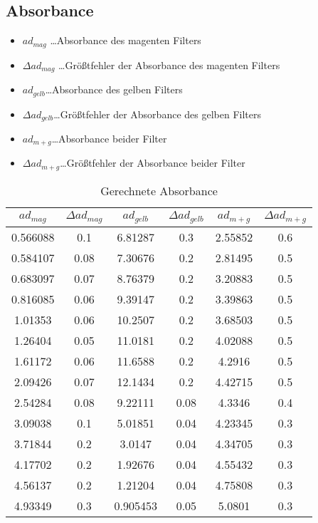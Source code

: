 \documentclass[a4paper]{article}
\begin{document}
\subsection{Absorbance}
\begin{table}[ht]
  \centering
  \caption{Gerechnete Absorbance}
  \begin{itemize}
    \item $ad_{mag}$ \dots Absorbance des magenten Filters
    \item $\Delta ad_{mag}$ \dots Größtfehler der Absorbance des magenten Filters
    \item $ad_{gelb}$\dots Absorbance des gelben Filters
    \item $\Delta ad_{gelb}$\dots Größtfehler der Absorbance des gelben Filters
    \item $ad_{m+g}$\dots Absorbance beider Filter
    \item $\Delta ad_{m+g}$\dots Größtfehler der Absorbance beider Filter
  \end{itemize}
  \begin{tabular}{|c|c|c|c|c|c|}
    \hline
    $ad_{mag}$&$\Delta ad_{mag}$& $ad_{gelb}$&$\Delta ad_{gelb}$& $ad_{m+g}$&$\Delta ad_{m+g}$\\\hline
 0.566088 & 0.1&    6.81287 & 0.3&    2.55852 & 0.6\\\hline
 0.584107 & 0.08&   7.30676 & 0.2&    2.81495 & 0.5\\\hline
 0.683097 & 0.07&   8.76379 & 0.2&    3.20883 & 0.5\\\hline
 0.816085 & 0.06&   9.39147 & 0.2&    3.39863 & 0.5\\\hline
 1.01353 & 0.06&    10.2507 & 0.2&    3.68503 & 0.5\\\hline
 1.26404 & 0.05&    11.0181 & 0.2&    4.02088 & 0.5\\\hline
 1.61172 & 0.06&    11.6588 & 0.2&    4.2916 & 0.5\\\hline
 2.09426 & 0.07&    12.1434 & 0.2&    4.42715 & 0.5\\\hline
 2.54284 & 0.08&    9.22111 & 0.08&   4.3346 & 0.4\\\hline
 3.09038 & 0.1&     5.01851 & 0.04&   4.23345 & 0.3\\\hline
 3.71844 & 0.2&     3.0147 & 0.04&    4.34705 & 0.3\\\hline
 4.17702 & 0.2&     1.92676 & 0.04&   4.55432 & 0.3\\\hline
 4.56137 & 0.2&     1.21204 & 0.04&   4.75808 & 0.3\\\hline
 4.93349 & 0.3&     0.905453 & 0.05&  5.0801 & 0.3\\\hline

\end{tabular}
\end{table}
\end{document}

